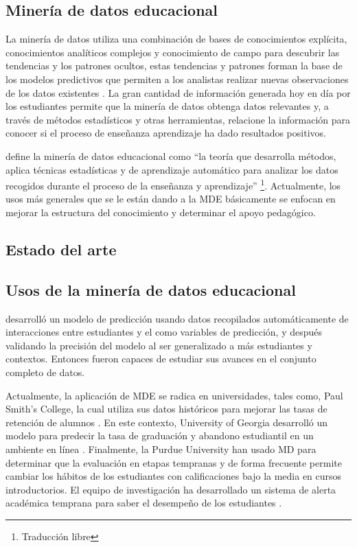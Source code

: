 \subsection*{Minería de datos educacional}
La minería de datos utiliza una combinación de bases de conocimientos explícita, conocimientos analíticos complejos y conocimiento de campo para descubrir las tendencias y los patrones ocultos, estas tendencias y patrones forman la base de los modelos predictivos que permiten a los analistas realizar nuevas observaciones de los datos existentes \parencite{luan2002data}. La gran cantidad de información generada hoy en día por los estudiantes permite que la minería de datos obtenga datos relevantes y, a través de métodos estadísticos y otras herramientas, relacione la información para conocer si el proceso de enseñanza aprendizaje ha dado resultados positivos. 

\textcite[p.~9]{mining2012enhancing} define la minería de datos educacional como “la teoría que desarrolla métodos, aplica técnicas estadísticas y de aprendizaje automático para analizar los datos recogidos durante el proceso de la enseñanza y aprendizaje” \footnote{Traducción libre}. Actualmente, los usos más generales que se le están dando a la MDE básicamente se enfocan en mejorar la estructura del conocimiento y determinar el apoyo pedagógico.

\subsection{Estado del arte}

\subsection*{Usos de la minería de datos educacional}


\textcite{baker2010data} desarrolló un modelo de predicción usando datos recopilados automáticamente de interacciones entre estudiantes y el  como variables de predicción, y después validando la precisión del modelo al ser generalizado a más estudiantes y contextos. Entonces fueron capaces de estudiar sus avances en el conjunto completo de datos.

Actualmente, la aplicación de MDE se radica en universidades, tales como, Paul Smith’s College, la cual utiliza sus datos históricos para mejorar las tasas de retención de alumnos \parencite{bichsel2012analytics}. En este contexto, University of Georgia desarrolló un modelo para predecir la tasa de graduación y abandono estudiantil en un ambiente en línea \parencite{morris2005predicting}. Finalmente, la Purdue University han usado MD para determinar que la evaluación en etapas tempranas y de forma frecuente permite cambiar los hábitos de los estudiantes con calificaciones bajo la media en cursos introductorios. El equipo de investigación ha desarrollado un sistema de alerta académica temprana para saber el desempeño de los estudiantes \parencite{baepler2010academic}. 

